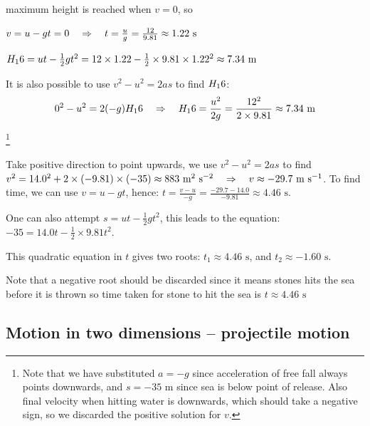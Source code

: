 \begin{soln} maximum height is reached when $v=0$, so

	\centering
	
	$v = u-gt = 0 \quad \Rightarrow \quad t= \frac{u}{g} = \frac{12}{9.81} \approx 1.22 \text{ s}$
	
	$H_16 = ut-\frac{1}{2}gt^2 = 12\times1.22 - \frac{1}{2}\times9.81\times1.22^2 \approx 7.34 \text{ m}$
	


It is also possible to use $v^2 - u^2 = 2as$ to find $H_16$:
\begin{equation*}
0^2 - u^2 = 2(-g)H_16 \quad \Rightarrow \quad H_16 = \frac{u^2}{2g} = \frac{12^2}{2\times9.81} \approx 7.34 \text{ m} 
\end{equation*}
\end{soln}

\footnote{Note that we have substituted  $a=-g$ since acceleration of free fall always points downwards, and $s=-35\text{ m}$ since sea is below point of release. Also final velocity when hitting water is downwards, which should take a negative sign, so we discarded the positive solution for $v$.}
\begin{soln}
 Take positive direction to point upwards, we use $v^2 - u^2 = 2as$ to find $v^2 = 14.0^2 + 2\times(-9.81)\times(-35) \approx 883 \text{ m}^2 \text{ s}^{-2} \quad \Rightarrow \quad v\approx -29.7\text{ m s$^{-1}$}$.
 To find time, we can use $v = u-gt$, hence: $ t = \frac{v-u}{-g} = \frac{-29.7-14.0}{-9.81} \approx 4.46 \text{ s} $.

One can also attempt $s = ut - \frac{1}{2}gt^2$, this leads to the equation: $-35 = 14.0t - \frac{1}{2}\times9.81t^2$.

This quadratic equation in $t$ gives two roots: $t_1 \approx 4.46 \text{ s}$, and $t_2 \approx -1.60 \text{ s}$.

Note that a negative root should be discarded since it means stones hits the sea before it is thrown so time taken for stone to hit the sea is $t \approx 4.46\text{ s}$ \end{soln}

\subsection{Motion in two dimensions -- projectile motion}\label{ch:projectile}

